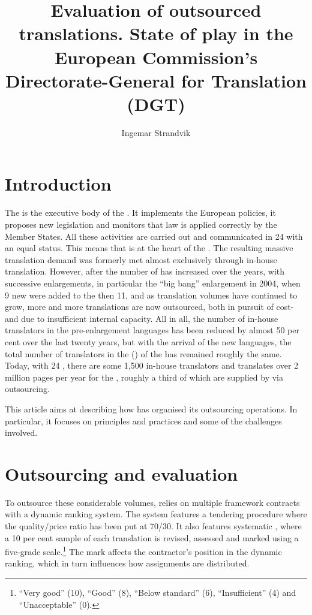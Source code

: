 \documentclass[output=paper]{langsci/langscibook}
\author{Ingemar Strandvik\affiliation{Directorate-General for Translation, European Commission$^*$}}
\title{Evaluation of outsourced translations. State of play in the European Commission's Directorate-General for Translation (DGT)}
\begin{document}
\section{Introduction}\label{sec:strandvik:strandvik:1} 

The  is the executive body of the . It implements the European policies, it proposes new legislation and monitors that  law is applied correctly by the Member States. All these activities are carried out and communicated in 24  with an equal status. This means that  is at the heart of the . The resulting massive translation demand was formerly met almost exclusively through in-house translation. However, after the number of  has increased over the years, with successive enlargements, in particular the ``big bang'' enlargement in 2004, when 9 new  were added to the then 11, and as translation volumes have continued to grow, more and more translations are now outsourced, both in pursuit of cost- and due to insufficient internal capacity. All in all, the number of in-house translators in the pre-enlargement languages has been reduced by almost 50 per cent over the last twenty years, but with the arrival of the new languages, the total number of translators in the  () of the  has remained roughly the same. Today, with 24 , there are some 1,500 in-house translators and  translates over 2 million pages per year for the , roughly a third of which are supplied by  via outsourcing. 

This article aims at describing how  has organised its outsourcing operations. In particular, it focuses on  principles and practices and some of the challenges involved.

\section{Outsourcing and evaluation}\label{sec:strandvik:strandvic:2}

To outsource these considerable volumes,  relies on multiple framework contracts with a dynamic ranking system. The system features a tendering procedure where the quality/price ratio has been put at 70/30. It also features systematic , where a 10 per cent sample of each translation is revised, assessed and marked using a five-grade scale.\footnote{``Very good'' (10), ``Good'' (8), ``Below standard'' (6), ``Insufficient'' (4) and ``Unacceptable'' (0).} The mark affects the contractor's position in the dynamic ranking, which in turn influences how assignments are distributed.
\end{document}
